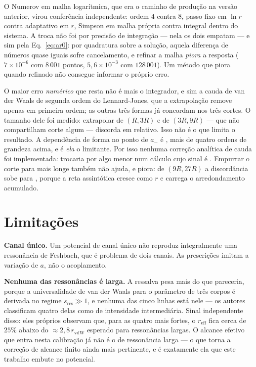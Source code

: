 \documentclass[11pt,a4paper]{article}
\begin{document}
O Numerov em malha logarítmica, que era o caminho de produção na versão
anterior, virou conferência independente: ordem $4$ contra $8$, passo fixo em
$\ln r$ contra adaptativo em $r$, Simpson em malha própria contra integral
dentro do sistema. A troca não foi por precisão de integração --- nela os dois
empatam --- e sim pela Eq.~\eqref{eq:ar0}: por quadratura sobre a solução,
aquela diferença de números quase iguais sofre cancelamento, e refinar a malha
\emph{piora} a resposta ($7\times10^{-6}$ com $8\,001$ pontos,
$5{,}6\times10^{-3}$ com $128\,001$). Um método que piora quando refinado não
consegue informar o próprio erro.

O maior erro \emph{numérico} que resta não é mais o integrador, e sim a cauda
de van der Waals de segunda ordem do Lennard-Jones, que a extrapolação remove
apenas em primeira ordem; as outras três formas já concordam nos três cortes.
O tamanho dele foi medido: extrapolar de $(R,3R)$ e de $(3R,9R)$ --- que não
compartilham corte algum --- discorda em \EtrychCaudaResiduo{} relativo. Isso
não é o que limita o resultado. A dependência de forma no ponto de $a_-$ é
\EtrychLequeAmenos{}, mais de quatro ordens de grandeza acima, e é \emph{ela} o
limitante. Por isso nenhuma correção analítica de cauda foi implementada:
trocaria \EtrychCaudaResiduo{} por algo menor num cálculo cujo sinal é
\EtrychLequeAmenos{}. Empurrar o corte para mais longe também não ajuda, e
piora: de $(9R,27R)$ a discordância sobe para \EtrychCaudaResiduoLonge{},
porque a reta assintótica cresce como $r$ e carrega o arredondamento
acumulado.

\section{Limitações}

\textbf{Canal único.} Um potencial de canal único não reproduz integralmente
uma ressonância de Feshbach, que é problema de dois canais. As prescrições
imitam a variação de $a$, não o acoplamento.

\textbf{Nenhuma das ressonâncias é larga.} A ressalva pesa mais do que
pareceria, porque a universalidade de van der Waals para o parâmetro de três
corpos é derivada no regime $s_\mathrm{res}\gg1$, e nenhuma das cinco linhas está
nele --- os autores classificam quatro delas como de intensidade intermediária.
Sinal independente disso: eles próprios observam que, para as quatro mais
fortes, o $r_\mathrm{eff}$ fica cerca de $25\%$ abaixo do
$\approx2{,}8\,r_\mathrm{vdW}$ esperado para ressonâncias largas. O alcance
efetivo que entra nesta calibração já não é o de ressonância larga --- o que
torna a correção de alcance finito ainda mais pertinente, e é exatamente ela
que este trabalho embute no potencial.
\end{document}
